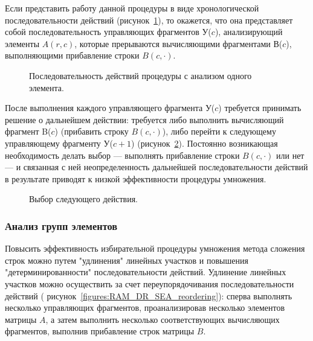 \documentclass[a4paper,12pt]{report}
\begin{document}
Если представить работу данной процедуры в виде хронологической последовательности действий
(рисунок~\ref{figures:RAM_DR_SEA_sequence}), то окажется, что она представляет собой
последовательность управляющих фрагментов У($c$), анализирующий элементы $A(r,c)$, которые прерываются вычисляющими
фрагментами В($c$), выполняющими прибавление строки $B(c,\cdot)$. 

\begin{figure}[h!]
	\caption{Последовательность действий процедуры с анализом одного элемента.}
	\label{figures:RAM_DR_SEA_sequence}
\end{figure}

После выполнения каждого управляющего фрагмента У($c$) требуется принимать решение о дальнейшем действии: требуется
либо выполнить вычисляющий фрагмент B($c$) (прибавить строку $B(c,\cdot)$), либо перейти к следующему управляющему
фрагменту У($c+1$) (рисунок~\ref{figures:RAM_DR_SEA_choice}). Постоянно возникающая необходимость
делать выбор --- выполнять прибавление строки $B(c,\cdot)$ или нет --- и связанная с ней неопределенность дальнейшей
последовательности действий в результате приводят к низкой эффективности процедуры умножения.

\begin{figure}[h!]
	\caption{Выбор следующего действия.}
	\label{figures:RAM_DR_SEA_choice}
\end{figure}

\subsubsection { Анализ групп элементов } \label{subsubsection:RAM_DR_element_group_analysis}

Повысить эффективность избирательной процедуры умножения метода сложения строк можно путем "удлинения"{}
линейных участков и повышения "детерминированности"{} последовательности действий. Удлинение линейных участков
можно осуществить за счет переупорядочивания последовательности действий (
рисунок~\ref{figures:RAM_DR_SEA_reordering}):
сперва выполнять несколько управляющих фрагментов, проанализировав несколько элементов матрицы $A$, а затем выполнить несколько
соответствующих вычисляющих фрагментов, выполнив прибавление строк матрицы $B$.
\end{document}
